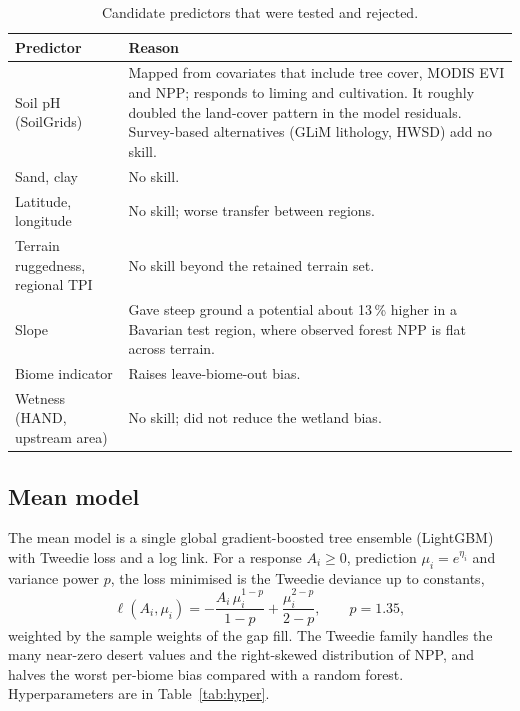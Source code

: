 \documentclass[11pt,a4paper]{article}
\begin{document}
\begin{table}[H]
\centering\small
\caption{Candidate predictors that were tested and rejected.}
\label{tab:excluded}
\begin{tabularx}{\textwidth}{lL}
\toprule
Predictor & Reason \\
\midrule
Soil pH (SoilGrids) & Mapped from covariates that include tree cover, MODIS EVI and NPP; responds to liming and cultivation. It roughly doubled the land-cover pattern in the model residuals. Survey-based alternatives (GLiM lithology, HWSD) add no skill. \\
Sand, clay & No skill. \\
Latitude, longitude & No skill; worse transfer between regions. \\
Terrain ruggedness, regional TPI & No skill beyond the retained terrain set. \\
Slope & Gave steep ground a potential about 13\,\% higher in a Bavarian test region, where observed forest NPP is flat across terrain. \\
Biome indicator & Raises leave-biome-out bias. \\
Wetness (HAND, upstream area) & No skill; did not reduce the wetland bias. \\
\bottomrule
\end{tabularx}
\end{table}

\subsection{Mean model}

The mean model is a single global gradient-boosted tree ensemble (LightGBM) with Tweedie loss
and a log link. For a response $A_i \ge 0$, prediction $\mu_i = e^{\eta_i}$ and variance power
$p$, the loss minimised is the Tweedie deviance up to constants,
\begin{equation}
\ell(A_i, \mu_i) = -\frac{A_i\,\mu_i^{1-p}}{1-p} + \frac{\mu_i^{2-p}}{2-p}, \qquad p = 1.35,
\end{equation}
weighted by the sample weights of the gap fill. The Tweedie family handles the many near-zero
desert values and the right-skewed distribution of NPP, and halves the worst per-biome bias
compared with a random forest. Hyperparameters are in Table~\ref{tab:hyper}.
\end{document}
